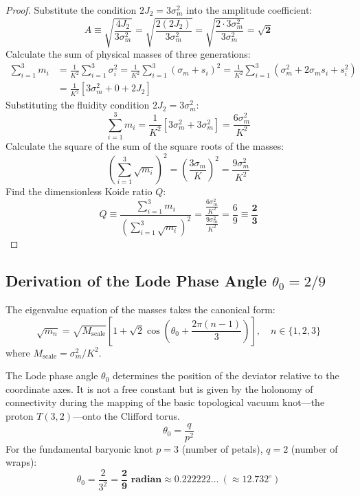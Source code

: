 \documentclass[12pt,a4paper]{article}
\begin{document}
	\begin{proof}
		Substitute the condition $2 J_2 = 3 \sigma_m^2$ into the amplitude coefficient:
		\begin{equation}
			A \equiv \sqrt{\frac{4 J_2}{3 \sigma_m^2}} = \sqrt{\frac{2 (2 J_2)}{3 \sigma_m^2}} = \sqrt{\frac{2 \cdot 3 \sigma_m^2}{3 \sigma_m^2}} = \mathbf{\sqrt{2}}
		\end{equation}
		Calculate the sum of physical masses of three generations:
		\begin{align}
			\sum_{i=1}^3 m_i &= \frac{1}{K^2} \sum_{i=1}^3 \sigma_i^2 = \frac{1}{K^2} \sum_{i=1}^3 \left( \sigma_m + s_i \right)^2 = \frac{1}{K^2} \sum_{i=1}^3 \left( \sigma_m^2 + 2\sigma_m s_i + s_i^2 \right) \nonumber \\
			&= \frac{1}{K^2} \left[ 3 \sigma_m^2 + 0 + 2 J_2 \right]
		\end{align}
		Substituting the fluidity condition $2 J_2 = 3 \sigma_m^2$:
		\begin{equation}
			\sum_{i=1}^3 m_i = \frac{1}{K^2} \left[ 3 \sigma_m^2 + 3 \sigma_m^2 \right] = \frac{6 \sigma_m^2}{K^2}
		\end{equation}
		Calculate the square of the sum of the square roots of the masses:
		\begin{equation}
			\left( \sum_{i=1}^3 \sqrt{m_i} \right)^2 = \left( \frac{3 \sigma_m}{K} \right)^2 = \frac{9 \sigma_m^2}{K^2}
		\end{equation}
		Find the dimensionless Koide ratio $Q$:
		\begin{equation}
			Q \equiv \frac{\sum_{i=1}^3 m_i}{\left( \sum_{i=1}^3 \sqrt{m_i} \right)^2} = \frac{\frac{6 \sigma_m^2}{K^2}}{\frac{9 \sigma_m^2}{K^2}} = \frac{6}{9} \equiv \mathbf{\frac{2}{3}}
		\end{equation}
	\end{proof}
	
	\subsection{Derivation of the Lode Phase Angle $\theta_0 = 2/9$}
	The eigenvalue equation of the masses takes the canonical form:
	\begin{equation}
		\sqrt{m_n} = \sqrt{M_{\text{scale}}} \left[ 1 + \sqrt{2} \cos\left( \theta_0 + \frac{2\pi(n-1)}{3} \right) \right], \quad n \in \{1, 2, 3\}
	\end{equation}
	where $M_{\text{scale}} = \sigma_m^2 / K^2$.
	
	The Lode phase angle $\theta_0$ determines the position of the deviator relative to the coordinate axes. It is not a free constant but is given by the holonomy of connectivity during the mapping of the basic topological vacuum knot—the proton $T(3,2)$—onto the Clifford torus.
	\begin{equation}
		\theta_0 = \frac{q}{p^2}
	\end{equation}
	For the fundamental baryonic knot $p=3$ (number of petals), $q=2$ (number of wraps):
	\begin{equation}
		\theta_0 = \frac{2}{3^2} = \mathbf{\frac{2}{9} \text{ radian}} \approx 0.222222 \dots \ (\approx 12.732^\circ)
	\end{equation}
	
\end{document}

